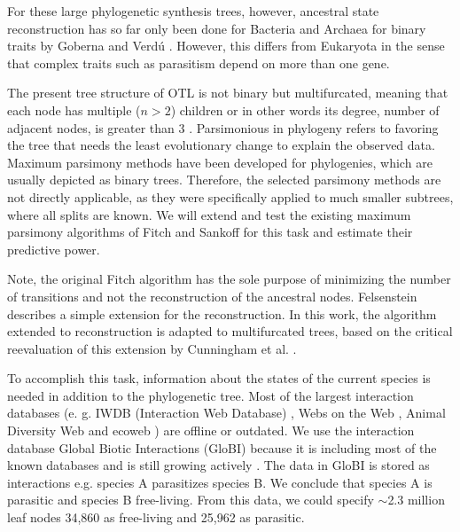   For these large phylogenetic synthesis trees, however, ancestral state reconstruction has so far 
    only been done for Bacteria and Archaea for binary traits by Goberna and Verdú \cite{Goberna2015}.
    However, this differs from Eukaryota in the sense that complex traits such as parasitism depend
    on more than one gene.

  The present tree structure of OTL is not binary but multifurcated, meaning that each node has
    multiple ($n > 2$) children or in other words its degree, number of adjacent nodes, is greater 
    than 3 \cite{Felsenstein2003}. Parsimonious in phylogeny refers to favoring the tree that needs 
    the least evolutionary change to explain the observed data. Maximum parsimony methods have been 
    developed for phylogenies, which are usually depicted as binary trees. Therefore, the selected 
    parsimony methods are not directly applicable, as they were specifically applied to much smaller 
    subtrees, where all splits are known. We will extend and test the existing maximum parsimony 
    algorithms of Fitch \cite{Fitch1971} and Sankoff \cite{Sankoff1975} for this task and estimate 
    their predictive power. 

  Note, the original Fitch algorithm has the sole purpose of minimizing the number of transitions 
    and not the reconstruction of the ancestral nodes. Felsenstein \cite{Felsenstein2003} describes 
    a simple extension for the reconstruction. In this work, the algorithm extended to 
    reconstruction is adapted to multifurcated trees, based on the critical reevaluation of this 
    extension by Cunningham et al. \cite{Cunningham1998}.

  To accomplish this task, information about the states of the current species is needed in addition 
    to the phylogenetic tree.  Most of the largest interaction databases (e. g. IWDB (Interaction 
    Web Database) \cite{IWDB2003}, Webs on the Web \cite{WOW2004}, Animal Diversity Web 
    \cite{Myers2003} and ecoweb \cite{Cohen2010}) are offline or outdated. We use the interaction 
    database Global Biotic Interactions (GloBI) \cite{Poelen2014} because it is including most of 
    the known databases and is still growing actively \cite{Poelen2014}. The data in GloBI is stored 
    as interactions e.g. species A parasitizes species B. We conclude that species A is parasitic 
    and species B free-living. From this data, we could specify $\sim$2.3 million leaf nodes 34,860 
    as free-living and 25,962 as parasitic. 

